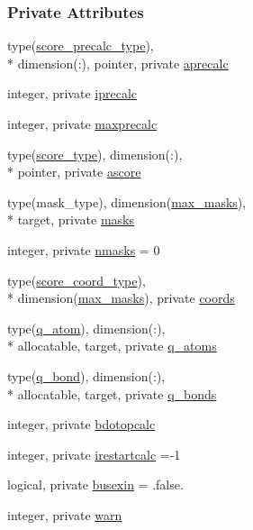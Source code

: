 \subsubsection*{Private Attributes}
\begin{DoxyCompactItemize}
\item 
type(\hyperlink{structcalc__chemscore_1_1score__precalc__type}{score\-\_\-precalc\-\_\-type}), \\*
dimension(\-:), pointer, private \hyperlink{classcalc__chemscore_a586a968234f3a2338f8f7a045122ccb7}{aprecalc}
\item 
integer, private \hyperlink{classcalc__chemscore_a55ea4b33c86233768f0a6f859c2023b6}{iprecalc}
\item 
integer, private \hyperlink{classcalc__chemscore_a5bff437603dc25b9d5bd6537a8039f2d}{maxprecalc}
\item 
type(\hyperlink{structcalc__chemscore_1_1score__type}{score\-\_\-type}), dimension(\-:), \\*
pointer, private \hyperlink{classcalc__chemscore_ab15cb5a3ebf1b4cff3c3a65acbf76159}{ascore}
\item 
type(mask\-\_\-type), dimension(\hyperlink{classcalc__chemscore_a035d2a19bada1d6c65c8ac2d7574c263}{max\-\_\-masks}), \\*
target, private \hyperlink{classcalc__chemscore_ae95a0840a35137beed3bcc7ff4345626}{masks}
\item 
integer, private \hyperlink{classcalc__chemscore_a7a4e890daa5f6464f57b789a0a0a82a9}{nmasks} = 0
\item 
type(\hyperlink{structcalc__chemscore_1_1score__coord__type}{score\-\_\-coord\-\_\-type}), \\*
dimension(\hyperlink{classcalc__chemscore_a035d2a19bada1d6c65c8ac2d7574c263}{max\-\_\-masks}), private \hyperlink{classcalc__chemscore_ab1a63356a1ac975b5dd189e550e7e143}{coords}
\item 
type(\hyperlink{structcalc__chemscore_1_1q__atom}{q\-\_\-atom}), dimension(\-:), \\*
allocatable, target, private \hyperlink{classcalc__chemscore_afb82a7d43bbfe0502a2131ea40819b60}{q\-\_\-atoms}
\item 
type(\hyperlink{structcalc__chemscore_1_1q__bond}{q\-\_\-bond}), dimension(\-:), \\*
allocatable, target, private \hyperlink{classcalc__chemscore_ad19a31c4b53236429ca22cc9f16a8283}{q\-\_\-bonds}
\item 
integer, private \hyperlink{classcalc__chemscore_aaefd70da86dc7e096e752cb92073e59a}{bdotopcalc}
\item 
integer, private \hyperlink{classcalc__chemscore_ae221adc2a0ae83b528c10fe7b2493c80}{irestartcalc} =-\/1
\item 
logical, private \hyperlink{classcalc__chemscore_a33ff8ef2871f086a64634d3af142e368}{busexin} = .false.
\item 
integer, private \hyperlink{classcalc__chemscore_af393275025caa6267b2c9ee46fadd3d7}{warn}
\end{DoxyCompactItemize}


